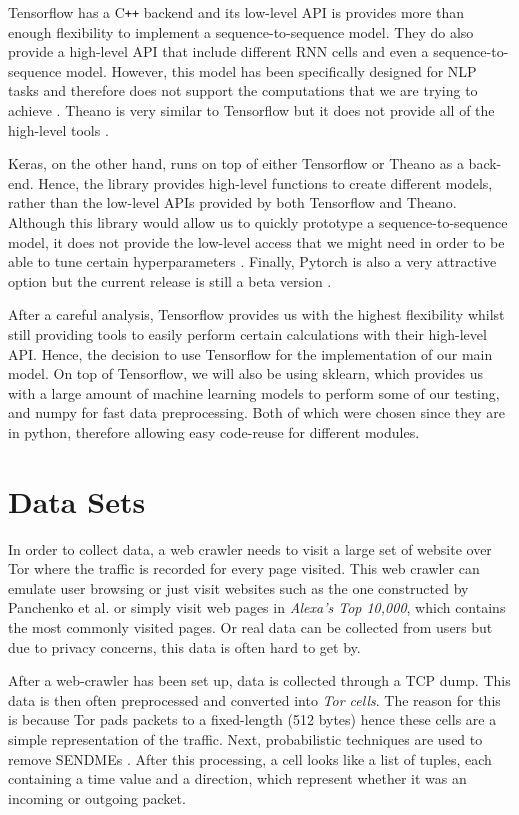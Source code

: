 Tensorflow has a C\texttt{++} backend and its low-level API is provides more than enough flexibility to implement a sequence-to-sequence model.
They do also provide a high-level API that include different RNN cells and even a sequence-to-sequence model.
However, this model has been specifically designed for NLP tasks and therefore does not support the computations that we are trying to achieve \cite{tensorflow}.
Theano is very similar to Tensorflow but it does not provide all of the high-level tools \cite{theano}.

Keras, on the other hand, runs on top of either Tensorflow or Theano as a back-end.
Hence, the library provides high-level functions to create different models, rather than the low-level APIs provided by both Tensorflow and Theano.
Although this library would allow us to quickly prototype a sequence-to-sequence model, it does not provide the low-level access that we might need in order to be able to tune certain hyperparameters \cite{keras}.
Finally, Pytorch is also a very attractive option but the current release is still a beta version \cite{torch}.

After a careful analysis, Tensorflow provides us with the highest flexibility whilst still providing tools to easily perform certain calculations with their high-level API.
Hence, the decision to use Tensorflow for the implementation of our main model.
On top of Tensorflow, we will also be using sklearn, which provides us with a large amount of machine learning models to perform some of our testing, and numpy for fast data preprocessing.
Both of which were chosen since they are in python, therefore allowing easy code-reuse for different modules.

\section{Data Sets}

In order to collect data, a web crawler needs to visit a large set of website over Tor where the traffic is recorded for every page visited.
This web crawler can emulate user browsing or just visit websites such as the one constructed by Panchenko et al. \cite{panchenko2} or simply visit web pages in \textit{Alexa’s Top 10,000}, which contains the most commonly visited pages.
Or real data can be collected from users but due to privacy concerns, this data is often hard to get by.

After a web-crawler has been set up, data is collected through a TCP dump.
This data is then often preprocessed and converted into \textit{Tor cells}.
The reason for this is because Tor pads packets to a fixed-length (512 bytes) \cite{tor_project} hence these cells are a simple representation of the traffic.
Next, probabilistic techniques are used to remove SENDMEs \cite{wang_goldberg_2013}.
After this processing, a cell looks like a list of tuples, each containing a time value and a direction, which represent whether it was an incoming or outgoing packet.

